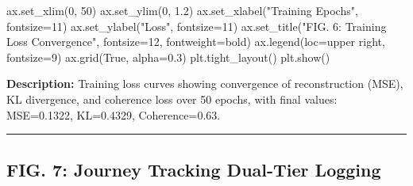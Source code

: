 \documentclass[
  letterpaper,
  DIV=11,
  numbers=noendperiod]{scrartcl}
\newenvironment{Shaded}{\begin{snugshade}}{\end{snugshade}}
\newcommand{\DecValTok}[1]{\textcolor[rgb]{0.68,0.00,0.00}{#1}}
\newcommand{\FloatTok}[1]{\textcolor[rgb]{0.68,0.00,0.00}{#1}}
\newcommand{\NormalTok}[1]{\textcolor[rgb]{0.00,0.23,0.31}{#1}}
\newcommand{\OperatorTok}[1]{\textcolor[rgb]{0.37,0.37,0.37}{#1}}
\newcommand{\StringTok}[1]{\textcolor[rgb]{0.13,0.47,0.30}{#1}}
\newcommand{\VariableTok}[1]{\textcolor[rgb]{0.07,0.07,0.07}{#1}}
\begin{document}
\begin{Shaded}
\begin{Highlighting}[]
\NormalTok{ax.set\_xlim(}\DecValTok{0}\NormalTok{, }\DecValTok{50}\NormalTok{)}
\NormalTok{ax.set\_ylim(}\DecValTok{0}\NormalTok{, }\FloatTok{1.2}\NormalTok{)}
\NormalTok{ax.set\_xlabel(}\StringTok{"Training Epochs"}\NormalTok{, fontsize}\OperatorTok{=}\DecValTok{11}\NormalTok{)}
\NormalTok{ax.set\_ylabel(}\StringTok{"Loss"}\NormalTok{, fontsize}\OperatorTok{=}\DecValTok{11}\NormalTok{)}
\NormalTok{ax.set\_title(}\StringTok{"FIG. 6: Training Loss Convergence"}\NormalTok{, fontsize}\OperatorTok{=}\DecValTok{12}\NormalTok{, fontweight}\OperatorTok{=}\StringTok{\textquotesingle{}bold\textquotesingle{}}\NormalTok{)}
\NormalTok{ax.legend(loc}\OperatorTok{=}\StringTok{\textquotesingle{}upper right\textquotesingle{}}\NormalTok{, fontsize}\OperatorTok{=}\DecValTok{9}\NormalTok{)}
\NormalTok{ax.grid(}\VariableTok{True}\NormalTok{, alpha}\OperatorTok{=}\FloatTok{0.3}\NormalTok{)}
\NormalTok{plt.tight\_layout()}
\NormalTok{plt.show()}
\end{Highlighting}
\end{Shaded}

\textbf{Description:} Training loss curves showing convergence of
reconstruction (MSE), KL divergence, and coherence loss over 50 epochs,
with final values: MSE=0.1322, KL=0.4329, Coherence=0.63.

\begin{center}\rule{0.5\linewidth}{0.5pt}\end{center}

\subsection{FIG. 7: Journey Tracking Dual-Tier
Logging}\label{fig.-7-journey-tracking-dual-tier-logging}
\end{document}
